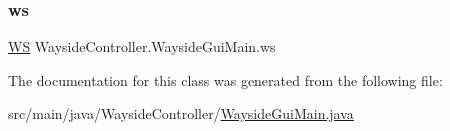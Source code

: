 \subsubsection{\texorpdfstring{ws}{ws}}
{\footnotesize\ttfamily \hyperlink{classWaysideController_1_1WS}{WS} Wayside\+Controller.\+Wayside\+Gui\+Main.\+ws\hspace{0.3cm}{\ttfamily [private]}}



The documentation for this class was generated from the following file\+:\begin{DoxyCompactItemize}
\item 
src/main/java/\+Wayside\+Controller/\hyperlink{WaysideGuiMain_8java}{Wayside\+Gui\+Main.\+java}\end{DoxyCompactItemize}
